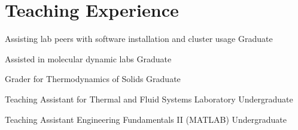 \section{Teaching Experience}

Assisting lab peers with software installation and cluster usage \hfill Graduate

Assisted in molecular dynamic labs \hfill Graduate

Grader for Thermodynamics of Solids \hfill Graduate
 
Teaching Assistant for Thermal and Fluid Systems Laboratory \hfill Undergraduate

Teaching Assistant Engineering Fundamentals II (MATLAB) \hfill Undergraduate%
